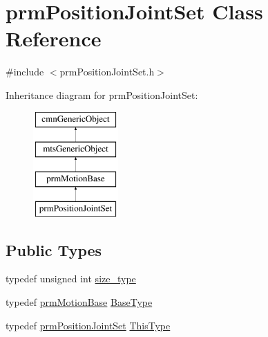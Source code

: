 \hypertarget{classprm_position_joint_set}{}\section{prm\+Position\+Joint\+Set Class Reference}
\label{classprm_position_joint_set}


{\ttfamily \#include $<$prm\+Position\+Joint\+Set.\+h$>$}

Inheritance diagram for prm\+Position\+Joint\+Set\+:\begin{figure}[H]
\begin{center}
\leavevmode
\includegraphics[height=4.000000cm]{d0/df2/classprm_position_joint_set}
\end{center}
\end{figure}
\subsection*{Public Types}
\begin{DoxyCompactItemize}
\item 
typedef unsigned int \hyperlink{classprm_position_joint_set_a66e5a37bee0bb819b63270879d3ab08f}{size\+\_\+type}
\item 
typedef \hyperlink{classprm_motion_base}{prm\+Motion\+Base} \hyperlink{classprm_position_joint_set_a6e9b539600bf96ea6bad0516f577e7c2}{Base\+Type}
\item 
typedef \hyperlink{classprm_position_joint_set}{prm\+Position\+Joint\+Set} \hyperlink{classprm_position_joint_set_a8017067d40939015fc62a7b9e7fc70e1}{This\+Type}
\end{DoxyCompactItemize}
